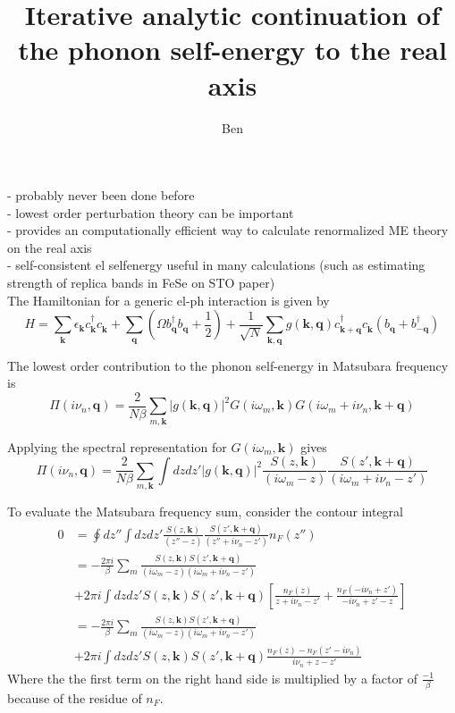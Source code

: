 \documentclass[]{article}
\title{Iterative analytic continuation of the phonon self-energy to the real axis}
\author{Ben}
\newcommand{\kk}{\mathbf{k}}
\newcommand{\qq}{\mathbf{q}}
\newcommand{\iwm}{i\omega_m}
\newcommand{\cd}[1]{c_{#1}^\dagger}
\newcommand{\cc}[1]{c_{#1}^{\phantom{\dagger}}}
\newcommand{\gs}{\left| g(\mathbf{k}, \mathbf{q}) \right|^2}
\newcommand{\ivn}{i\nu_n}
\begin{document}
\maketitle

\begin{abstract}

\end{abstract}

- probably never been done before\\
- lowest order perturbation theory can be important \\
- provides an computationally efficient way to calculate renormalized ME theory on the real axis\\
- self-consistent el selfenergy useful in many calculations (such as estimating strength of replica bands in FeSe on STO paper)\\


The Hamiltonian for a generic el-ph interaction is given by
\begin{equation}
H = \sum_\kk \epsilon_\kk \cd{\kk} \cc{\kk}
 + \sum_\qq \left( \Omega b^\dagger_\qq b^{\phantom{\dagger}}_\qq + \frac{1}{2}\right) + \frac{1}{\sqrt{N}} \sum_{\kk,\qq} g(\kk, \qq) \cd{\kk+\qq} \cc{\kk} \left( b^{\phantom{\dagger}}_\qq + b^\dagger_{-\qq} \right) 
\end{equation}

The lowest order contribution to the phonon self-energy in Matsubara frequency is
\begin{equation}
\Pi(\ivn, \qq) = \frac{2}{N \beta} \sum_{m,\kk} \gs G(\iwm, \kk) G(\iwm+\ivn,\kk+\qq)
\end{equation}

Applying the spectral representation for $G(\iwm,\kk)$ gives
\begin{equation}
\Pi(\ivn, \qq) = \frac{2}{N \beta} \sum_{m,\kk} \int dz dz' \gs \frac{S(z, \kk)}{(\iwm-z)} \frac{S(z', \kk+\qq)}{(\iwm+\ivn-z')}
\end{equation}

To evaluate the Matsubara frequency sum, consider the contour integral
\begin{equation}
\begin{split}
0 &= \oint dz'' \int dz dz' \frac{S(z, \kk)}{(z''-z)} \frac{S(z', \kk+\qq)}{(z''+\ivn-z')} n_F(z'')\\
& = -\frac{2\pi i}{\beta} \sum_m \frac{S(z,\kk)S(z',\kk+\qq)}{(\iwm-z)(\iwm+\ivn-z')} \\
& + 2\pi i \int dz dz' S(z,\kk)S(z',\kk+\qq)\left[ \frac{n_F(z)}{z+\ivn-z'} + \frac{n_F(-\ivn+z')}{-\ivn+z'-z} \right] \\
& = -\frac{2\pi i}{\beta} \sum_m \frac{S(z,\kk)S(z',\kk+\qq)}{(\iwm-z)(\iwm+\ivn-z')} \\
& + 2\pi i \int dz dz' S(z,\kk)S(z',\kk+\qq)\frac{n_F(z)-n_F(z'-\ivn)}{\ivn+z-z'}
\end{split}
\end{equation}
Where the the first term on the right hand side is multiplied by a factor of $\frac{-1}{\beta}$ because of the residue of $n_F$.
\\
\end{document}
